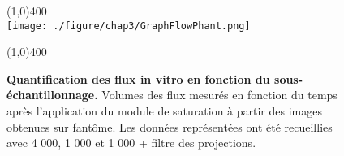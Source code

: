 \begin{figure}[H]
\centering \line(1,0){400} \\
\texttt{[image: ./figure/chap3/GraphFlowPhant.png]}
\caption[Quantification des flux in vitro en fonction du sous-échantillonnage.]{\label{fig:GraphFlowPhant} \textbf{Quantification des flux in vitro en fonction du sous-échantillonnage.} Volumes des flux mesurés en fonction du temps après l'application du module de saturation à partir des images obtenues sur fantôme. Les données représentées ont été recueillies avec 4 000, 1 000 et 1 000 + filtre des projections.}
\line(1,0){400} \\ \end{figure}

%
%

